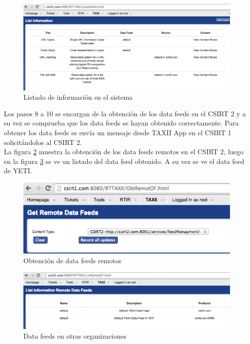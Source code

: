 \begin{figure}[H]
	\centering
	\includegraphics[scale=0.3]{caso-de-estudio/listadoInfo.png}
	\caption{Listado de información en el sistema}
	\label{fig.lstinfo}
\end{figure}

Los pasos 8 a 10 se encargan de la obtención de los data feeds en el CSIRT 2 y a su vez se comprueba que los data feeds se hayan obtenido correctamente. Para obtener los data feeds se envía un mensaje desde TAXII App en el CSIRT 1 solicitándolos al CSIRT 2. \\
La figura \ref{fig.obtremote} muestra la obtención de los data feeds remotos en el CSIRT 2, luego en la figura \ref{fig.lstremotedf} se ve un listado del data feed obtenido. A su vez se ve el data feed de YETI.

\begin{figure}[H]
	\centering
	\includegraphics[scale=0.5]{caso-de-estudio/obtremote.png}
	\caption{Obtención de data feeds remotos}
	\label{fig.obtremote}
\end{figure}

\begin{figure}[H]
	\centering
	\includegraphics[scale=0.4]{caso-de-estudio/lstremotedf.png}
	\caption{Data feeds en otras organizaciones}
	\label{fig.lstremotedf}
\end{figure}

